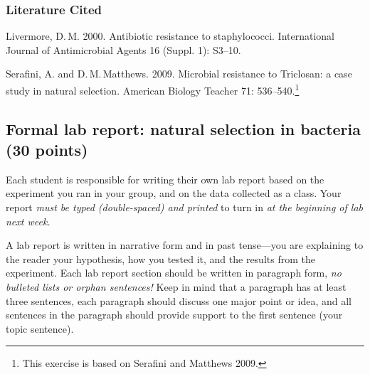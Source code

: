 \documentclass[12pt]{exam}
\newlength{\litindent}
\begin{document}
\begin{questions}
\begin{center}


\end{center}

\end{questions}

\subsubsection*{Literature Cited}

Livermore, D.\,M. 2000. Antibiotic resistance to staphylococci. International Journal of Antimicrobial Agents 16 (Suppl. 1): S3–10.

Serafini, A. and D.\,M.\,Matthews. 2009. Microbial resistance to Triclosan: a case study in natural selection. American Biology Teacher 71: 536–540.\footnote{This exercise is based on Serafini and Matthews 2009.}

\newpage

\subsection*{Formal lab report: natural selection in bacteria (30 points)}

Each student is responsible for writing their own lab report based on
the experiment you ran in your group, and on the data collected as a
class. Your report \emph{must be typed (double-spaced) and printed} to
turn in \emph{at the beginning of lab next week.}  

A lab report is written in narrative form and in past tense—you are
explaining to the reader your hypothesis, how you tested it, and the
results from the experiment. Each lab report section should be written
in paragraph form, \emph{no bulleted lists or orphan sentences!} Keep in
mind that a paragraph has at least three sentences, each paragraph should
discuss one major point or idea, and all sentences in the paragraph
should provide support to the first sentence (your topic sentence).
\end{document}
